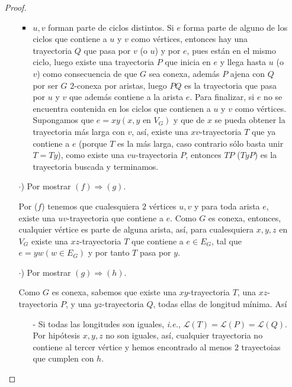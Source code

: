 \documentclass{article}
\begin{document}
\begin{enumerate}
\begin{proof}
\begin{itemize}
\begin{itemize}
      \item $u, v$ forman parte de ciclos distintos. Si $e$ forma
        parte de alguno de los ciclos que contiene a $u$ y $v$ como
        vértices, entonces hay una trayectoria $Q$ que pasa por $v$
        (o $u$) y por $e$, pues están en el mismo ciclo, luego existe
        una trayectoria $P$ que inicia en $e$ y llega hasta $u$ (o $v$)
        como consecuencia de que $G$ sea conexa, además $P$ ajena con $Q$
        por ser $G$ $2$-conexa por aristas, luego $PQ$ es la trayectoria
        que pasa por $u$ y $v$ que además contiene a la arista $e$. Para
        finalizar, si $e$ no se encuentra contenida en los ciclos que
        contienen a $u$ y $v$ como vértices. Supongamos que
        $e = xy (x, y \text{ en } V_G)$ y que de $x$ se pueda obtener la
        trayectoria más larga con $v$, así, existe una $xv$-trayectoria $T$
        que ya contiene a $e$ (porque $T$ es la más larga, caso contrario
        sólo basta unir $T = Ty$), como existe una $vu$-trayectoria $P$,
        entonces $TP$ ($TyP$) es la trayectoria buscada y terminamos.
      \end{itemize}

    \item[$\cdot$)] Por mostrar $(f) \Rightarrow (g)$.

      Por ($f$) tenemos que cualesquiera $2$ vértices $u, v$ y para
      toda arista $e$, existe una $uv$-trayectoria que contiene a $e$.
      Como $G$ es conexa, entonces, cualquier vértice es parte de alguna
      arista, así, para cualesquiera $x, y, z$ en $V_G$ existe una
      $xz$-trayectoria $T$ que contiene a $e \in E_G$, tal que $e =
      yw (w \in E_G)$ y por tanto $T$ pasa por $y$.

    \item[$\cdot$)] Por mostrar $(g) \Rightarrow (h)$.

      Como $G$ es conexa, sabemos que existe una $xy$-trayectoria $T$,
      una $xz$-trayectoria $P$, y una $yz$-trayectoria $Q$, todas ellas
      de longitud mínima. Así

      \begin{itemize}
      \item[-] Si todas las longitudes son iguales, \textit{i.e.}, $\mathcal{L}(T)
        = \mathcal{L}(P) = \mathcal{L}(Q)$. Por hipótesis $x,y,z$ no son iguales,
        así, cualquier trayectoria no contiene al tercer vértice y hemos encontrado
        al menos $2$ trayectoias que cumplen con $h$.


\end{itemize}
\end{itemize}
\end{proof}
\end{enumerate}
\end{document}
